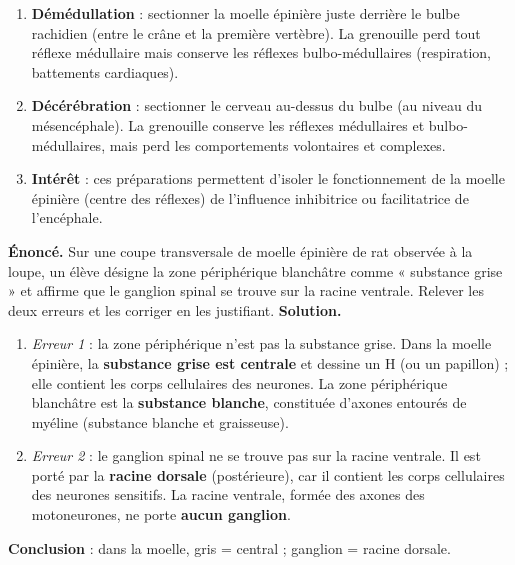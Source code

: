 \documentclass[11pt]{article}
\begin{document}
\begin{methode}
\begin{enumerate}
\item \textbf{Démédullation} : sectionner la moelle épinière juste derrière le bulbe rachidien (entre le crâne et la première vertèbre). La grenouille perd tout réflexe médullaire mais conserve les réflexes bulbo-médullaires (respiration, battements cardiaques).
\item \textbf{Décérébration} : sectionner le cerveau au-dessus du bulbe (au niveau du mésencéphale). La grenouille conserve les réflexes médullaires et bulbo-médullaires, mais perd les comportements volontaires et complexes.
\item \textbf{Intérêt} : ces préparations permettent d'isoler le fonctionnement de la moelle épinière (centre des réflexes) de l'influence inhibitrice ou facilitatrice de l'encéphale.
\end{enumerate}
\end{methode}

\begin{exoresolu}
\textbf{Énoncé.} Sur une coupe transversale de moelle épinière de rat observée à la loupe, un élève désigne la zone périphérique blanchâtre comme « substance grise » et affirme que le ganglion spinal se trouve sur la racine ventrale. Relever les deux erreurs et les corriger en les justifiant.
\tcblower
\textbf{Solution.} 
\begin{enumerate}
\item \emph{Erreur 1} : la zone périphérique n'est pas la substance grise. Dans la moelle épinière, la \textbf{substance grise est centrale} et dessine un H (ou un papillon) ; elle contient les corps cellulaires des neurones. La zone périphérique blanchâtre est la \textbf{substance blanche}, constituée d'axones entourés de myéline (substance blanche et graisseuse).
\item \emph{Erreur 2} : le ganglion spinal ne se trouve pas sur la racine ventrale. Il est porté par la \textbf{racine dorsale} (postérieure), car il contient les corps cellulaires des neurones sensitifs. La racine ventrale, formée des axones des motoneurones, ne porte \textbf{aucun ganglion}.
\end{enumerate}
\textbf{Conclusion} : dans la moelle, gris = central ; ganglion = racine dorsale.
\end{exoresolu}
\end{document}
